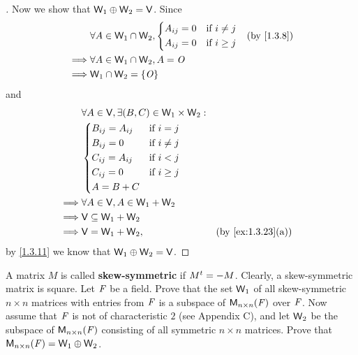 \begin{proof}[]
  Now we show that \(\mathsf{W}_1 \oplus \mathsf{W}_2 = \mathsf{V}\).
  Since
  \begin{align*}
             & \forall A \in \W_1 \cap \W_2, \begin{dcases}
                                               A_{i j} = 0 & \text{if } i \neq j \\
                                               A_{i j} = 0 & \text{if } i \geq j
                                             \end{dcases} &  & \by{1.3.8} \\
    \implies & \forall A \in \W_1 \cap \W_2, A = \zm                           \\
    \implies & \W_1 \cap \W_2 = \set{\zm}
  \end{align*}
  and
  \begin{align*}
             & \forall A \in \V, \exists (B, C) \in \W_1 \times \W_2 :                        \\
             & \begin{dcases}
                 B_{i j} = A_{i j} & \text{if } i = j    \\
                 B_{i j} = 0       & \text{if } i \neq j \\
                 C_{i j} = A_{i j} & \text{if } i < j    \\
                 C_{i j} = 0       & \text{if } i \geq j \\
                 A = B + C
               \end{dcases}                                        \\
    \implies & \forall A \in \V, A \in \W_1 + \W_2                                            \\
    \implies & \V \subseteq \W_1 + \W_2                                                       \\
    \implies & \V = \W_1 + \W_2,                                       &  & \by{ex:1.3.23}[a]
  \end{align*}
  by \cref{1.3.11} we know that \(\mathsf{W}_1 \oplus \mathsf{W}_2 = \mathsf{V}\).
\end{proof}

\begin{ex}\label{ex:1.3.28}
  A matrix \(M\) is called \textbf{skew-symmetric} if \({M}^{t} = -M\).
  Clearly, a skew-symmetric matrix is square.
  Let \(\mathit{F}\) be a field.
  Prove that the set \(\mathsf{W}_1\) of all skew-symmetric \(n \times n\) matrices with entries from \(\mathit{F}\) is a subspace of \(\ms[n][n][\F]\) over \(\mathit{F}\).
  Now assume that \(\mathit{F}\) is not of characteristic \(2\) (see Appendix C), and let \(\mathsf{W}_2\) be the subspace of \(\ms[n][n][\F]\) consisting of all symmetric \(n \times n\) matrices.
  Prove that \(\ms[n][n][\F] = \W_1 \oplus \W_2\).
\end{ex}

